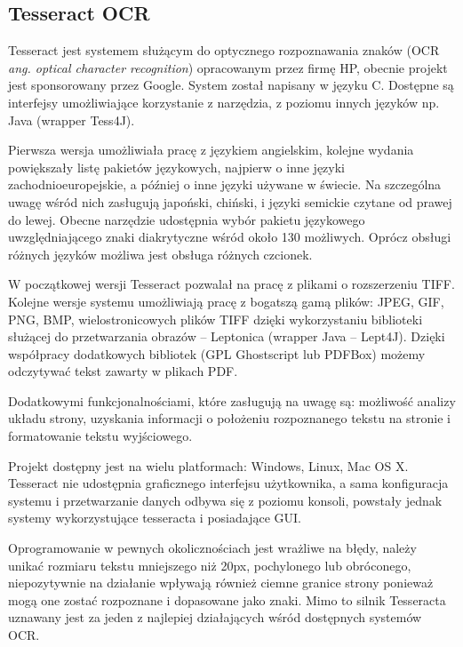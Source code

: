 \documentclass[a4paper,12pt]{article}
\newcommand\spacingIndent{2.2em}
\begin{document}
        
        
	\subsection{Tesseract OCR}
	    \hspace{\spacingIndent} Tesseract jest systemem służącym do optycznego rozpoznawania znaków (OCR \textit{ang. optical character recognition}) 
			opracowanym przez firmę HP, obecnie projekt jest sponsorowany przez Google. System został napisany w języku C. 
			Dostępne są interfejsy umożliwiające korzystanie z narzędzia, z poziomu innych języków np. Java (wrapper Tess4J). 
			
			 Pierwsza wersja umożliwiała pracę z językiem angielskim, kolejne wydania powiększały listę pakietów językowych, 
			najpierw o inne języki zachodnioeuropejskie, a później o inne języki używane w świecie. Na szczególna uwagę wśród nich zasługują japoński, chiński, 
			i języki semickie czytane od prawej do lewej. Obecne narzędzie udostępnia wybór pakietu językowego uwzględniającego 
			znaki diakrytyczne wśród około 130 możliwych. Oprócz obsługi różnych języków możliwa jest obsługa różnych czcionek. 
			
			W początkowej wersji Tesseract pozwalał na pracę z plikami o rozszerzeniu TIFF. Kolejne wersje systemu umożliwiają pracę z bogatszą gamą plików: 
			JPEG, GIF, PNG, BMP, wielostronicowych plików TIFF dzięki wykorzystaniu biblioteki służącej do przetwarzania obrazów -- Leptonica 
			(wrapper Java -- Lept4J). Dzięki współpracy dodatkowych bibliotek (GPL Ghostscript lub PDFBox) możemy odczytywać tekst zawarty w plikach PDF. 
			
			Dodatkowymi funkcjonalnościami, które zasługują na uwagę są: możliwość analizy układu strony, uzyskania informacji o położeniu rozpoznanego tekstu na stronie 
			i formatowanie tekstu wyjściowego. 
			
			Projekt dostępny jest na wielu platformach: Windows, Linux, Mac OS X. Tesseract nie udostępnia graficznego interfejsu użytkownika, 
			a sama konfiguracja systemu i przetwarzanie danych odbywa się z poziomu konsoli, powstały jednak systemy wykorzystujące tesseracta i posiadające GUI. 
			
			Oprogramowanie w pewnych okolicznościach jest wrażliwe na błędy, należy unikać rozmiaru tekstu mniejszego niż 20px, pochylonego lub obróconego, 
			niepozytywnie na działanie wpływają również ciemne granice strony ponieważ mogą one zostać rozpoznane i dopasowane jako znaki. Mimo to silnik Tesseracta uznawany jest za jeden z najlepiej działających wśród dostępnych systemów OCR. 
\end{document}
